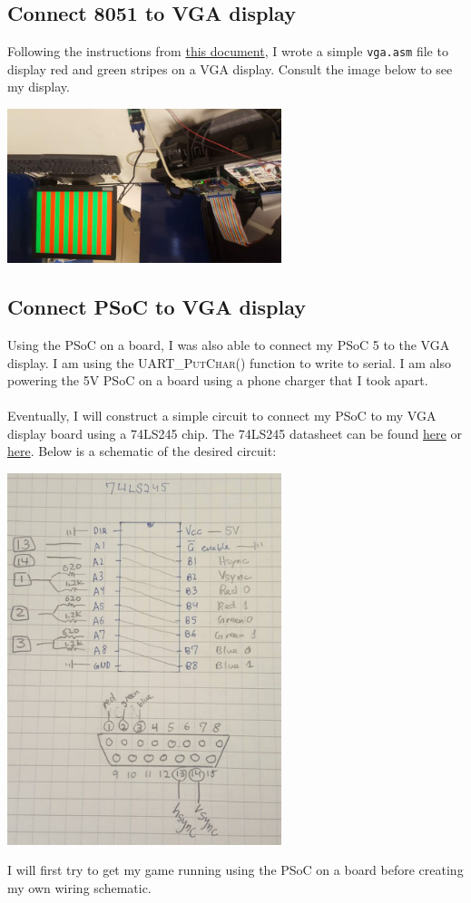 \documentclass[12pt,twoside]{article}
\begin{document}
\subsection{Connect 8051 to VGA display}
Following the instructions from \href{http://web.mit.edu/6.115/www/document/psoc_vga_manual.pdf}{this document}, I wrote a simple \texttt{vga.asm} file to display red and green stripes on a VGA display. Consult the image below to see my display.
\begin{center} \includegraphics[width = 80mm]{Pics/4-27a.jpg}  \end{center}

\subsection{Connect PSoC to VGA display}
Using the PSoC on a board, I was also able to connect my PSoC 5 to the VGA display. I am using the \textsc{UART\_PutChar()} function to write to serial. I am also powering the 5V PSoC on a board using a phone charger that I took apart. 
\\
\\ Eventually, I will construct a simple circuit to connect my PSoC to my VGA display board using a 74LS245 chip. The 74LS245 datasheet can be found \href{../Datasheets/74LS245.pdf}{here} or \href{http://www.futurlec.com/74LS/74LS245.shtml}{here}. Below is a schematic of the desired circuit:
\begin{center} \includegraphics[width = 80mm]{Pics/4-27b.jpg}  \end{center}
I will first try to get my game running using the PSoC on a board before creating my own wiring schematic.
\end{document}
